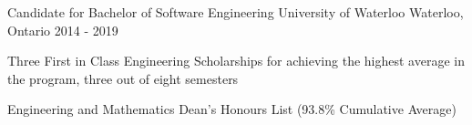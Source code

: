 \begin{cventries}
  \cventry
    {Candidate for Bachelor of Software Engineering}
    {University of Waterloo}
    {Waterloo, Ontario}
    {2014 - 2019}
    {
      \begin{cvitems}
      \item Three First in Class Engineering Scholarships for achieving the highest average in the program, three out of eight semesters
      \item Engineering and Mathematics Dean’s Honours List (93.8\% Cumulative Average)
      \end{cvitems}
    }
\end{cventries}
